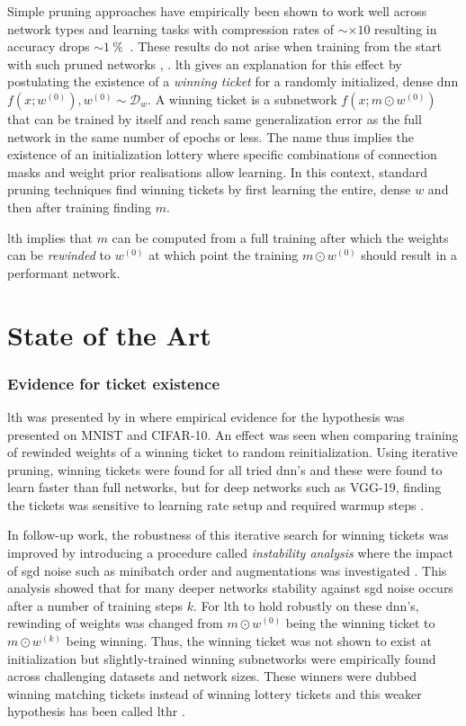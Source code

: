 \documentclass[12pt,fleqn,twocolumn]{article}
\newcommand{\pro}{\ensuremath{\:\%{}\:}}
\begin{document}
Simple pruning approaches have empirically been shown to work well across network types and learning tasks with compression rates of $\sim \times 10$ resulting in accuracy drops $\sim 1\pro$ \cite[Fig. 7] {bla2020state}.
These results do not arise when training from the start with such pruned networks \cite[Chap. 4]{li2016filt}, \cite[Chap. 3.3]{han2015learning}.
\acrshort{lth} gives an explanation for this effect by postulating the existence of a \emph{winning ticket} for a randomly initialized, dense \acrshort{dnn} $f(x;w^{(0)}), w^{(0)}\sim \mathcal D_w$.
A winning ticket is a subnetwork $f(x;m\odot w^{(0)})$ that can be trained by itself and reach same generalization error as the full network in the same number of epochs or less.
The name thus implies the existence of an initialization lottery where specific combinations of connection masks and weight prior realisations allow learning.
In this context, standard pruning techniques find winning tickets by first learning the entire, dense $w$ and then after training finding $m$.

\acrshort{lth} implies that $m$ can be computed from a full training after which the weights can be \emph{rewinded} to $w^{(0)}$ at which point the training $m \odot w^{(0)}$ should result in a performant network.

\section*{State of the Art}%
\subsubsection*{Evidence for ticket existence}
\acrshort{lth} was presented by \textcite{frankle2018the} in \citeyear{frankle2018the} where empirical evidence for the hypothesis was presented on MNIST and CIFAR-10.
An effect was seen when comparing training of rewinded weights of a winning ticket to random reinitialization.
Using iterative pruning, winning tickets were found for all tried \acrshort{dnn}'s and these were found to learn faster than full networks, but for deep networks such as VGG-19, finding the tickets was sensitive to learning rate setup and required warmup steps \cite[Chap. 4]{frankle2018the}.

In follow-up work, the robustness of this iterative search for winning tickets was improved by introducing a procedure called \emph{instability analysis} where the impact of \acrfull{sgd} noise such as minibatch order and augmentations was investigated \cite{Frankle2020LinearMC}.
This analysis showed that for many deeper networks stability against \acrshort{sgd} noise occurs after a number of training steps $k$.
For \acrshort{lth} to hold robustly on these \acrshort{dnn}'s, rewinding of weights was changed from $m \odot w^{(0)}$ being the winning ticket to $m\odot w^{(k)}$ being winning.
Thus, the winning ticket was not shown to exist at initialization but slightly-trained winning subnetworks were empirically found across challenging datasets and network sizes.
These winners were dubbed winning matching tickets instead of winning lottery tickets and this weaker hypothesis has been called \acrfull{lthr} \cite{lange2020lth} .
\end{document}
